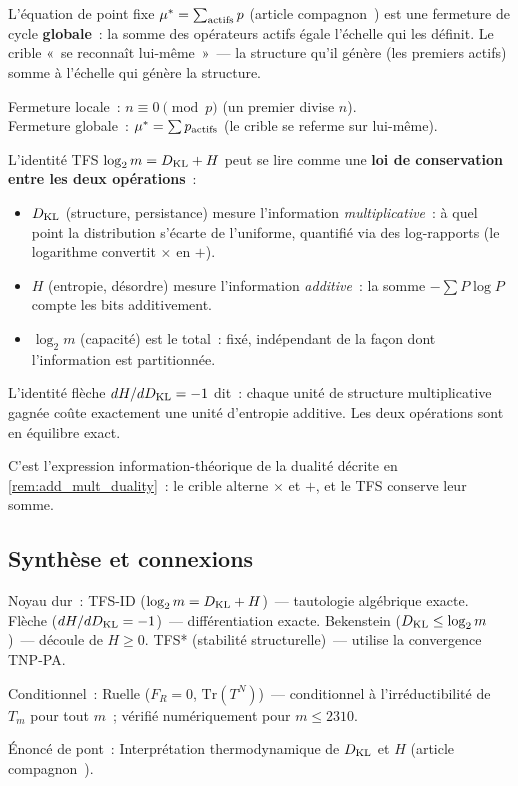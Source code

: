 \documentclass[12pt,a4paper]{article}
\begin{document}
\begin{remarque}
\label{rem:global_closure}
L'équation de point fixe ${\mu^{*}} = \sum_{\mathrm{actifs}} p$ (article
compagnon~\cite{companion_M3}) est une fermeture de cycle
\textbf{globale}~: la somme des opérateurs actifs égale l'échelle qui
les définit. Le crible «~se reconnaît lui-même~»~--- la structure
qu'il génère (les premiers actifs) somme à l'échelle qui génère la
structure.

Fermeture locale~: $n \equiv 0 \pmod{p}$ (un premier divise $n$).\\
Fermeture globale~: ${\mu^{*}} = \sum p_{\rm actifs}$ (le crible se
referme sur lui-même).
\end{remarque}

\begin{remarque}
\label{rem:gft_add_mult}
L'identité TFS $\log_2 m = D_{\mathrm{KL}} + H$ peut se lire comme une \textbf{loi
de conservation entre les deux opérations}~:
\begin{itemize}[nosep]
\item $D_{\mathrm{KL}}$ (structure, persistance) mesure l'information
  \emph{multiplicative}~: à quel point la distribution s'écarte de
  l'uniforme, quantifié via des log-rapports (le logarithme convertit
  $\times$ en $+$).
\item $H$ (entropie, désordre) mesure l'information \emph{additive}~:
  la somme $-\sum P \log P$ compte les bits additivement.
\item $\log_2 m$ (capacité) est le total~: fixé, indépendant de la
  façon dont l'information est partitionnée.
\end{itemize}
L'identité flèche $dH/dD_{\mathrm{KL}} = -1$ dit~: chaque unité de structure
multiplicative gagnée coûte exactement une unité d'entropie additive.
Les deux opérations sont en équilibre exact.

C'est l'expression information-théorique de la dualité décrite en
\cref{rem:add_mult_duality}~: le crible alterne $\times$ et $+$, et
le TFS conserve leur somme.
\end{remarque}

\subsection{Synthèse et connexions}
\label{sec:ch4_summary}

\begin{ledgerbox}
Noyau dur~:
  TFS-ID ($\log_2 m = D_{\rm KL} + H$)~--- tautologie algébrique
  exacte.
  Flèche ($dH/dD_{\rm KL} = -1$)~--- différentiation exacte.
  Bekenstein ($D_{\rm KL} \leq \log_2 m$)~--- découle de $H \geq 0$.
  TFS* (stabilité structurelle)~--- utilise la convergence TNP-PA.

Conditionnel~:
  Ruelle ($F_R = 0$, $\mathrm{Tr}(T^N)$)~--- conditionnel à
  l'irréductibilité de $T_m$ pour tout $m$~; vérifié numériquement
  pour $m \leq 2310$.

Énoncé de pont~:
  Interprétation thermodynamique de $D_{\rm KL}$ et $H$ (article
  compagnon~\cite{companion_M5}).
\end{ledgerbox}
\end{document}
